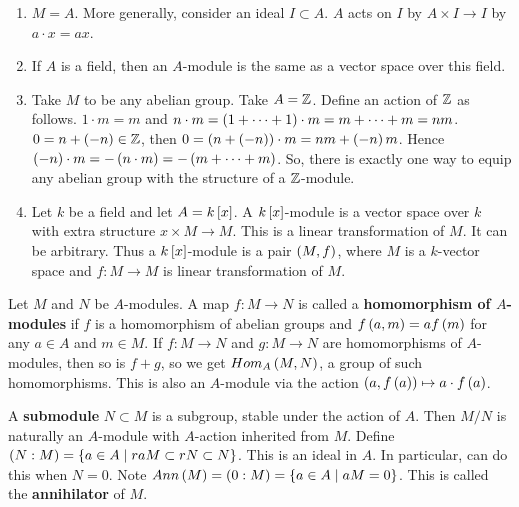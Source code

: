 \begin{example*}
\hfill
\begin{enumerate}
\item $ M = A $. More generally, consider an ideal $ I \subset A $. $ A $ acts on $ I $ by $ A \times I \to I $ by $ a \cdot x = ax $.
\item If $ A $ is a field, then an $ A $-module is the same as a vector space over this field.
\item Take $ M $ to be any abelian group. Take $ A = \Z $. Define an action of $ \Z $ as follows. $ 1 \cdot m = m $ and $ n \cdot m = \rb{1 + \dots + 1} \cdot m = m + \dots + m = nm $. $ 0 = n + \rb{- n} \in \Z $, then $ 0 = \rb{n + \rb{-n}} \cdot m = nm + \rb{-n}m $. Hence $ \rb{-n} \cdot m = -\rb{n \cdot m} = -\rb{m + \dots + m} $. So, there is exactly one way to equip any abelian group with the structure of a $ \Z $-module.
\item Let $ k $ be a field and let $ A = k\sb{x} $. A $ k\sb{x} $-module is a vector space over $ k $ with extra structure $ x \times M \to M $. This is a linear transformation of $ M $. It can be arbitrary. Thus a $ k\sb{x} $-module is a pair $ \rb{M, f} $, where $ M $ is a $ k $-vector space and $ f : M \to M $ is linear transformation of $ M $.
\end{enumerate}
\end{example*}

\begin{definition}
Let $ M $ and $ N $ be $ A $-modules. A map $ f : M \to N $ is called a \textbf{homomorphism of $ A $-modules} if $ f $ is a homomorphism of abelian groups and $ f\rb{a, m} = af\rb{m} $ for any $ a \in A $ and $ m \in M $. If $ f : M \to N $ and $ g : M \to N $ are homomorphisms of $ A $-modules, then so is $ f + g $, so we get $ Hom_A\rb{M, N} $, a group of such homomorphisms. This is also an $ A $-module via the action $ \rb{a, f\rb{a}} \mapsto a \cdot f\rb{a} $.
\end{definition}

\begin{definition}
A \textbf{submodule} $ N \subset M $ is a subgroup, stable under the action of $ A $. Then $ M / N $ is naturally an $ A $-module with $ A $-action inherited from $ M $. Define $ \rb{N : M} = \cb{a \in A \mid raM \subset rN \subset N} $. This is an ideal in $ A $. In particular, can do this when $ N = 0 $. Note $ Ann\rb{M} = \rb{0 : M} = \cb{a \in A \mid aM = 0} $. This is called the \textbf{annihilator} of $ M $.
\end{definition}

